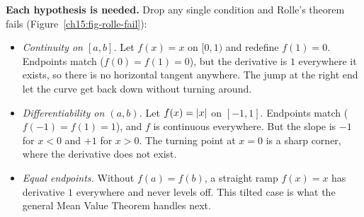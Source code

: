 \begin{trapbox}
\textbf{Each hypothesis is needed.} Drop any single condition and Rolle's
theorem fails (Figure~\ref{ch15:fig-rolle-fail}):
\begin{itemize}
\item \emph{Continuity on $[a,b]$.} Let $f(x)=x$ on $[0,1)$ and redefine $f(1)=0$.
Endpoints match ($f(0)=f(1)=0$), but the derivative is $1$ everywhere it exists, so
there is no horizontal tangent anywhere. The jump at the right end let the curve
get back down without turning around.
\item \emph{Differentiability on $(a,b)$.} Let $f(x)=\lvert x\rvert$ on $[-1,1]$. Endpoints
match ($f(-1)=f(1)=1$), and $f$ is continuous everywhere. But the slope is $-1$ for
$x<0$ and $+1$ for $x>0$. The turning point at $x=0$ is a sharp corner, where the
derivative does not exist.
\item \emph{Equal endpoints.} Without $f(a)=f(b)$, a straight ramp $f(x)=x$ has
derivative $1$ everywhere and never levels off. This tilted case is what
the general Mean Value Theorem handles next.
\end{itemize}
\end{trapbox}


